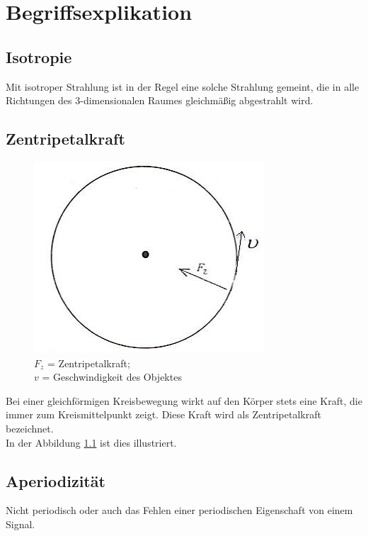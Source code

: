 \chapter{Begriffsexplikation}
\thispagestyle{fancy}
\label{chap:begriffsexplikation}
\section*{Isotropie}
\glqq Mit isotroper Strahlung ist in der Regel eine solche Strahlung gemeint, die in alle Richtungen des 3-dimensionalen Raumes gleichmäßig abgestrahlt wird.\grqq\;\cite{Isotropie}\\

\section*{Zentripetalkraft}
\begin{figure}
\centering
\vspace{-2cm}
\includegraphics[scale=0.5]{Bilder/zentripetalkraft.png} 
\caption[Zentripetalkraft]{$F_{z}$ = Zentripetalkraft;\\ $v$ = Geschwindigkeit des Objektes \cite{Rudolph2017}}
\vspace{-2cm}
\label{fig:zentripetalkraft}
\end{figure}
\glqq Bei einer gleichförmigen Kreisbewegung wirkt auf den Körper stets eine Kraft, die immer zum Kreismittelpunkt zeigt. Diese Kraft wird als Zentripetalkraft bezeichnet.\grqq\;\cite{Rudolph2017}
\\[0.5cm]
In der Abbildung \ref{fig:zentripetalkraft} ist dies illustriert.\\

\section*{Aperiodizität}
Nicht periodisch oder auch das Fehlen einer periodischen Eigenschaft von einem Signal.\\

